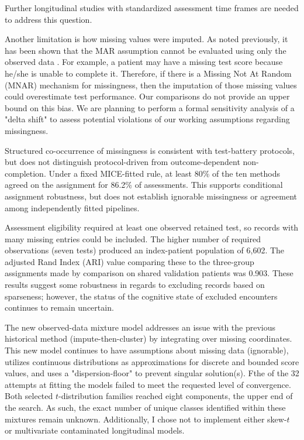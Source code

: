 Further longitudinal studies with standardized assessment time frames are needed to address this question.

Another limitation is how missing values were imputed. As noted previously, it has been shown that the MAR assumption cannot be evaluated using only the observed data \parencite{rubin1976inference,little2019statistical}. For example, a patient may have a missing test score because he/she is unable to complete it. Therefore, if there is a Missing Not At Random (MNAR) mechanism for missingness, then the imputation of those missing values could overestimate test performance. Our comparisons do not provide an upper bound on this bias. We are planning to perform a formal sensitivity analysis of a "delta shift" to assess potential violations of our working assumptions regarding missingness.

Structured co-occurrence of missingness is consistent with test-battery protocols, but does not distinguish protocol-driven from outcome-dependent non-completion. Under a fixed MICE-fitted rule, at least 80\% of the ten methods agreed on the assignment for 86.2\% of assessments. This supports conditional assignment robustness, but does not establish ignorable missingness or agreement among independently fitted pipelines.

Assessment eligibility required at least one observed retained test, so records with many missing entries could be included. The higher number of required observations (seven tests) produced an index-patient population of 6,602. The adjusted Rand Index (ARI) value comparing these to the three-group assignments made by comparison on shared validation patients was 0.903. These results suggest some robustness in regards to excluding records based on sparseness; however, the status of the cognitive state of excluded encounters continues to remain uncertain.

The new observed-data mixture model addresses an issue with the previous historical method (impute-then-cluster) by integrating over missing coordinates. This new model continues to have assumptions about missing data (ignorable), utilizes continuous distributions as approximations for discrete and bounded score values, and uses a "dispersion-floor" to prevent singular solution(s). Fthe of the 32 attempts at fitting the models failed to meet the requested level of convergence. Both selected $t$-distribution families reached eight components, the upper end of the search. As such, the exact number of unique classes identified within these mixtures remain unknown. Additionally, I chose not to implement either skew-$t$ or multivariate contaminated longitudinal models.

